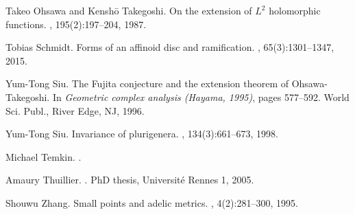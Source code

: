 \documentclass[10pt,reqno]{amsart}
\theoremstyle{plain}
\theoremstyle{definition}
\numberwithin{equation}{section}
\begin{document}
\begin{thebibliography}{BRG84}
Takeo Ohsawa and Kensh{\=o} Takegoshi.
\newblock On the extension of {$L^2$} holomorphic functions.
, 195(2):197--204, 1987.

Tobias Schmidt.
\newblock Forms of an affinoid disc and ramification.
, 65(3):1301--1347, 2015.

Yum-Tong Siu.
\newblock The {F}ujita conjecture and the extension theorem of
  {O}hsawa-{T}akegoshi.
\newblock In {\em Geometric complex analysis ({H}ayama, 1995)}, pages 577--592.
  World Sci. Publ., River Edge, NJ, 1996.

Yum-Tong Siu.
\newblock Invariance of plurigenera.
, 134(3):661--673, 1998.


Michael Temkin. 
. 

Amaury Thuillier.
.
\newblock PhD thesis, Universit{\'e} Rennes 1, 2005.

Shouwu Zhang.
\newblock Small points and adelic metrics.
, 4(2):281--300, 1995.

\end{thebibliography}
\end{document}
